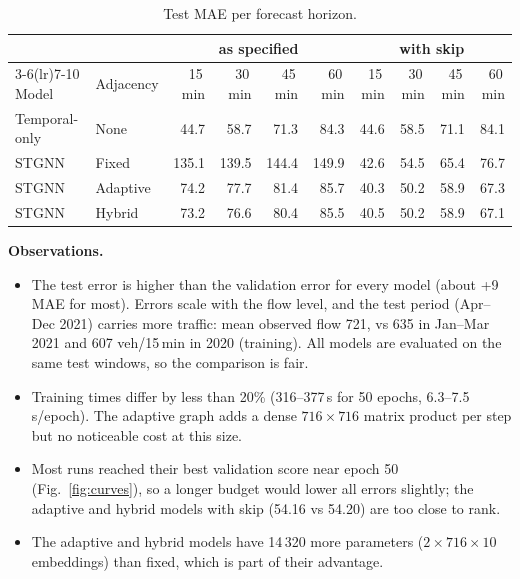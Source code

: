 \begin{table}[H]\centering\small
\caption{Test MAE per forecast horizon.}\label{tab:horizon}
\begin{tabular}{ll rrrr rrrr}\toprule
& & \multicolumn{4}{c}{as specified} & \multicolumn{4}{c}{with skip}\\\cmidrule(lr){3-6}\cmidrule(lr){7-10}
Model & Adjacency & 15\,min & 30\,min & 45\,min & 60\,min & 15\,min & 30\,min & 45\,min & 60\,min\\\midrule
Temporal-only & None & 44.7 & 58.7 & 71.3 & 84.3 & 44.6 & 58.5 & 71.1 & 84.1\\
STGNN & Fixed        & 135.1 & 139.5 & 144.4 & 149.9 & 42.6 & 54.5 & 65.4 & 76.7\\
STGNN & Adaptive     & 74.2 & 77.7 & 81.4 & 85.7 & 40.3 & 50.2 & 58.9 & 67.3\\
STGNN & Hybrid       & 73.2 & 76.6 & 80.4 & 85.5 & 40.5 & 50.2 & 58.9 & 67.1\\\bottomrule
\end{tabular}
\end{table}

\noindent\textbf{Observations.}
\begin{itemize}
\item The test error is higher than the validation error for every model (about +9 MAE for most). Errors scale with the flow level, and the
test period (Apr--Dec 2021) carries more traffic: mean observed flow 721, vs 635 in Jan--Mar 2021 and 607 veh/15\,min in 2020
(training). All models are evaluated on the same test windows, so the comparison is fair.
\item Training times differ by less than 20\% (316--377\,s for 50 epochs, 6.3--7.5\,s/epoch). The adaptive graph adds a dense
$716\times716$ matrix product per step but no noticeable cost at this size.
\item Most runs reached their best validation score near epoch 50 (Fig.~\ref{fig:curves}), so a longer budget would lower all errors
slightly; the adaptive and hybrid models with skip (54.16 vs 54.20) are too close to rank.
\item The adaptive and hybrid models have 14\,320 more parameters ($2\times716\times10$ embeddings) than fixed, which is part of their
advantage.
\end{itemize}

